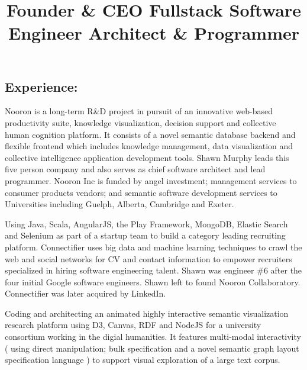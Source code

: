 \documentclass[line,margin,hidelinks]{res}
\begin{document}
\begin{resume}
\pagebreak
\section{Experience:}


\title{ Founder \& CEO }
\begin{position}
Nooron is a long-term R\&D project in pursuit of an innovative
web-based productivity suite, knowledge visualization, decision
support and collective human cognition platform.  It consists of a
novel semantic database backend and flexible frontend which includes
knowledge management, data visualization and collective intelligence
application development tools.  Shawn Murphy leads this five person
company and also serves as chief software architect and lead
programmer.  Nooron Inc is funded by angel investment; management
services to consumer products vendors; and semantic software
development services to Universities including Guelph, Alberta,
Cambridge and Exeter.
\end{position}

\title{ Fullstack Software Engineer }
\begin{position}
Using Java, Scala, AngularJS, the Play Framework, MongoDB, Elastic Search and Selenium
as part of a startup team to build a category leading recruiting platform.
Connectifier uses big data and machine learning techniques to crawl the web and social
networks for CV and contact information to empower recruiters specialized in hiring
software engineering talent.
Shawn was engineer \#6 after the four initial Google software engineers.
Shawn left to found Nooron Collaboratory.
Connectifier was later acquired by LinkedIn.
\end{position}

\title{ Architect \& Programmer }
\begin{position}
Coding and architecting an animated highly interactive semantic visualization research platform using
D3, Canvas, RDF and NodeJS for a university consortium working in the digial humanities.
It features multi-modal interactivity ( using direct manipulation; bulk specification
and a novel semantic graph layout specification language ) to support visual exploration of a
large text corpus.
\end{position}


\end{resume}
\end{document}
